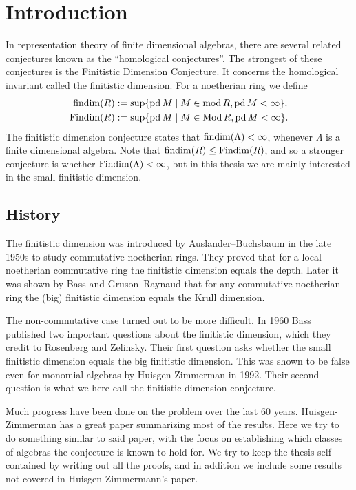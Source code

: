 \section*{Introduction}
%

In representation theory of finite dimensional algebras, there are several related conjectures known as the ``homological conjectures''. The strongest of these conjectures is the Finitistic Dimension Conjecture. It concerns the homological invariant called the finitistic dimension. For a noetherian ring we define
\begin{align*}
  \operatorname{findim}(R) &:= \sup\{\operatorname{pd} M \mid M \in \operatorname{mod} R, \operatorname{pd} M < \infty\},\\
  \operatorname{Findim}(R) &:= \sup\{\operatorname{pd} M \mid M \in \operatorname{Mod} R, \operatorname{pd} M < \infty\}.
\end{align*}
The finitistic dimension conjecture states that $\operatorname{findim}(\Lambda) < \infty$, whenever $\Lambda$ is a finite dimensional algebra. Note that $\operatorname{findim}(R) \leq \operatorname{Findim}(R)$, and so a stronger conjecture is whether $\operatorname{Findim}(\Lambda) < \infty$, but in this thesis we are mainly interested in the small finitistic dimension.

\subsection*{History}

The finitistic dimension was introduced by Auslander--Buchsbaum in the late 1950s to study commutative noetherian rings. They proved that for a local noetherian commutative ring the finitistic dimension equals the depth\cite{AB57}. Later it was shown by Bass and Gruson--Raynaud that for any commutative noetherian ring the (big) finitistic dimension equals the Krull dimension\cite{Bass62,RG71}.

The non-commutative case turned out to be more difficult. In 1960 Bass published two important questions about the finitistic dimension\cite{Bass60}, which they credit to Rosenberg and Zelinsky. Their first question asks whether the small finitistic dimension equals the big finitistic dimension. This was shown to be false even for monomial algebras by Huisgen-Zimmerman in 1992\cite{ZH92}. Their second question is what we here call the finitistic dimension conjecture. 

Much progress have been done on the problem over the last 60 years. Huisgen-Zimmerman has a great paper summarizing most of the results\cite{ZH95}. Here we try to do something similar to said paper, with the focus on establishing which classes of algebras the conjecture is known to hold for. We try to keep the thesis self contained by writing out all the proofs, and in addition we include some results not covered in Huisgen-Zimmermann's paper.

